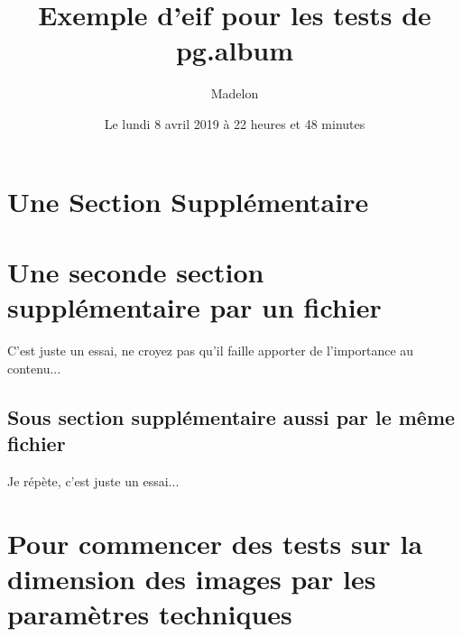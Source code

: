\documentclass[12pt,twocolumn,french]{article}
\begin{document}
\title{Exemple d'eif pour les tests de pg.album}
\author{Madelon}
\date{Le lundi 8 avril 2019 à 22 heures et 48 minutes}
\maketitle
\tableofcontents
\newpage
\vspace {25mm}

 \section{Une Section Supplémentaire}
\section {Une seconde section supplémentaire par un fichier}
C'est juste un essai, ne croyez pas qu'il faille apporter
de l'importance au contenu...
\subsection {Sous section supplémentaire aussi par le même fichier}
Je répète, c'est juste un essai...
\clearpage
%
\section{Pour commencer des tests sur la dimension des images par les paramètres techniques}
%
%
\end{document}
